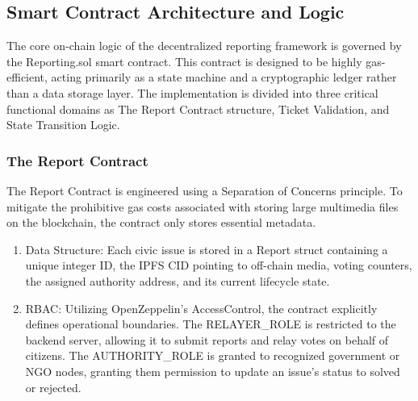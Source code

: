 \subsection{Smart Contract Architecture and Logic}

The core on-chain logic of the decentralized reporting framework is governed by the Reporting.sol smart contract. This contract is designed to be highly gas-efficient, acting primarily as a state machine and a cryptographic ledger rather than a data storage layer. The implementation is divided into three critical functional domains as The Report Contract structure, Ticket Validation, and State Transition Logic.

\subsubsection{The Report Contract}
The Report Contract is engineered using a Separation of Concerns principle. To mitigate the prohibitive gas costs associated with storing large multimedia files on the blockchain, the contract only stores essential metadata. 
\begin{enumerate}
    \item Data Structure: Each civic issue is stored in a Report struct containing a unique integer ID, the IPFS \ac{CID} pointing to off-chain media, voting counters, the assigned authority address, and its current lifecycle state.
    \item \ac{RBAC}: Utilizing OpenZeppelin's AccessControl, the contract explicitly defines operational boundaries. The RELAYER\_ROLE is restricted to the backend server, allowing it to submit reports and relay votes on behalf of citizens. The AUTHORITY\_ROLE is granted to recognized government or NGO nodes, granting them permission to update an issue's status to solved or rejected.
\end{enumerate}

